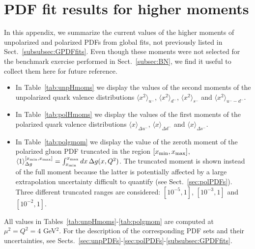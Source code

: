 \section{PDF fit results for higher moments }
\label{app:Hmoms}

In this appendix, we summarize the current values of the higher moments of 
unpolarized and polarized PDFs from global fits, not previously 
listed in Sect.~\ref{subsubsec:GPDFfits}.
%
Even though these moments were not selected for the benchmark exercise 
performed in Sect.~\ref{subsec:BN}, we find it useful to collect them 
here for future reference.

\begin{itemize}

\item In Table~\ref{tab:unpHmoms} we display the values of the second moments 
of the unpolarized quark valence distributions $\langle x^2\rangle_{u^-}$, 
$\langle x^2\rangle_{d^-}$, $\langle x^2\rangle_{s^-}$ and 
$\langle x^2\rangle_{u^--d^-}$.

\item In Table~\ref{tab:polHmoms} we display the values of the first moments 
of the polarized quark valence distributions $\langle x\rangle_{\Delta u^-}$, 
$\langle x\rangle_{\Delta d^-}$ and $\langle x\rangle_{\Delta s^-}$.

\item In Table~\ref{tab:polgmom} we display the value of the zeroth moment
of the polarized gluon PDF truncated in the region $[x_{\rm min}, x_{\rm max}]$,
$\langle 1\rangle_{\Delta g}^{[x_{\rm min}, x_{\rm max}]}=\int_{x_{\rm min}}^{x_{\rm max}}dx\,\Delta g(x,Q^2)$.
%
The truncated moment is shown instead of the full moment
because the latter is potentially affected by a large extrapolation 
uncertainty difficult to quantify (see Sect.~\ref{sec:polPDFs}). 
%
Three different truncated ranges are considered: $[10^{-5},1]$,  $[10^{-3},1]$
and  $[10^{-2},1]$.

\end{itemize}
%
All values in Tables~\ref{tab:unpHmoms}-\ref{tab:polgmom} are computed at 
$\mu^2=Q^2=4$ GeV$^2$.
%
For the description of the corresponding PDF sets and their uncertainties, see
Sects.~\ref{sec:unpPDFs}-\ref{sec:polPDFs}-\ref{subsubsec:GPDFfits}.

